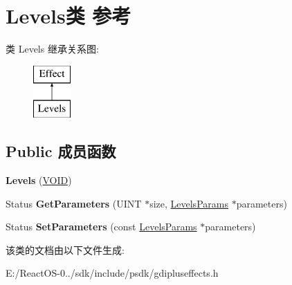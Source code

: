 \hypertarget{class_levels}{}\section{Levels类 参考}
\label{class_levels}
类 Levels 继承关系图\+:\begin{figure}[H]
\begin{center}
\leavevmode
\includegraphics[height=2.000000cm]{class_levels}
\end{center}
\end{figure}
\subsection*{Public 成员函数}
\begin{DoxyCompactItemize}
\item 
\mbox{\label{class_levels_ab5abd7378b3a6bbb3524b6f3de10fa09}} 
{\bfseries Levels} (\hyperlink{interfacevoid}{V\+O\+ID})
\item 
\mbox{\label{class_levels_a098908813291f9ddaca5ab7b711c092e}} 
Status {\bfseries Get\+Parameters} (U\+I\+NT $\ast$size, \hyperlink{struct_levels_params}{Levels\+Params} $\ast$parameters)
\item 
\mbox{\label{class_levels_a89242eeccb05da8a18b60b2608f229c7}} 
Status {\bfseries Set\+Parameters} (const \hyperlink{struct_levels_params}{Levels\+Params} $\ast$parameters)
\end{DoxyCompactItemize}


该类的文档由以下文件生成\+:\begin{DoxyCompactItemize}
\item 
E\+:/\+React\+O\+S-\/0../sdk/include/psdk/gdipluseffects.\+h\end{DoxyCompactItemize}
